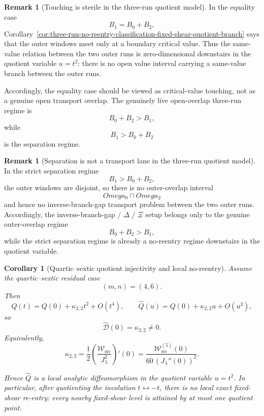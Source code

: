 \documentclass[11pt,a4paper]{amsart}
\def\Omega{Omega}%
\theoremstyle{plain}
\newtheorem{corollary}[theorem]{Corollary}
\theoremstyle{definition}
\newtheorem{remark}[theorem]{Remark}
\begin{document}
\begin{remark}[Touching is sterile in the three-run quotient model]
\label{rem:touching-is-sterile-three-run-quotient-model}
In the equality case
\[
B_1=B_0+B_2,
\]
Corollary~\ref{cor:three-run-no-reentry-classification-fixed-shear-quotient-branch}
says that the outer windows meet only at a boundary critical value. Thus the
same-value relation between the two outer runs is zero-dimensional downstairs in
the quotient variable $u=t^2$: there is no open value interval carrying a
same-value branch between the outer runs.

Accordingly, the equality case should be viewed as critical-value touching, not
as a genuine open transport overlap. The genuinely live open-overlap three-run
regime is
\[
B_0+B_2>B_1,
\]
while
\[
B_1>B_0+B_2
\]
is the separation regime.
\end{remark}

\begin{remark}[Separation is not a transport lane in the three-run quotient model]
\label{rem:separation-not-transport-lane-three-run-quotient-model}
In the strict separation regime
\[
B_1>B_0+B_2,
\]
the outer windows are disjoint, so there is no outer-overlap interval
\[
\Omega_0\cap\Omega_2
\]
and hence no inverse-branch-gap transport problem between the two outer runs.
Accordingly, the inverse-branch-gap / $\Delta$ / $\Xi$ setup belongs only to
the genuine outer-overlap regime
\[
B_0+B_2>B_1,
\]
while the strict separation regime is already a no-reentry regime downstairs in
the quotient variable.
\end{remark}

\begin{corollary}[Quartic--sextic quotient injectivity and local no-reentry]
\label{cor:quartic-sextic-quotient-injectivity-local-no-reentry}
Assume the quartic--sextic residual case
\[
(m,n)=(4,6).
\]
Then
\[
Q(t)=Q(0)+\kappa_{2,2}t^2+O(t^4),
\qquad
\widehat Q(u)=Q(0)+\kappa_{2,2}u+O(u^2),
\]
so
\[
\widehat{\mathcal D}(0)=\kappa_{2,2}\neq 0.
\]
Equivalently,
\[
\kappa_{2,2}
=
\frac12\left(\frac{\mathcal W_{\mathrm{src}}}{J_\lambda^2}\right)'(0)
=
\frac{\mathcal W_{\mathrm{src}}^{(5)}(0)}{60\,(J_\lambda''(0))^2}.
\]

Hence $\widehat Q$ is a local analytic diffeomorphism in the quotient variable
$u=t^2$. In particular, after quotienting the involution
$t\leftrightarrow -t$, there is no local exact fixed-shear re-entry: every
nearby fixed-shear level is attained by at most one quotient point.
\end{corollary}
\end{document}
